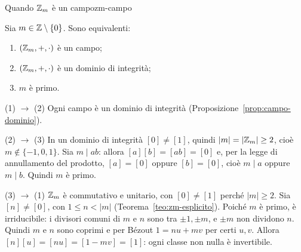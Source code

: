 \begin{concetto}
\begin{Teorema}{Quando $\mathbb{Z}_m$ è un campo}{zm-campo}
    \begin{prerequisiti}
    \end{prerequisiti}
    Sia $m \in \mathbb{Z} \setminus \{0\}$. Sono equivalenti:
    \begin{enumerate}
        \item $(\mathbb{Z}_m, +, \cdot)$ è un campo;
        \item $(\mathbb{Z}_m, +, \cdot)$ è un dominio di integrità;
        \item $m$ è primo.
    \end{enumerate}
\end{Teorema}
\begin{dimostrazione}
    \begin{caso}{(1) $\rightarrow$ (2)}
        Ogni campo è un dominio di integrità (Proposizione~\ref{prop:campo-dominio}).
    \end{caso}
    \begin{caso}{(2) $\rightarrow$ (3)}
        In un dominio di integrità $[0] \neq [1]$, quindi $|m| = |\mathbb{Z}_m| \geq 2$, cioè $m \notin \{-1, 0, 1\}$. Sia $m \mid ab$: allora
        $[a][b] = [ab] = [0]$ e, per la legge di annullamento del prodotto, $[a] = [0]$ oppure $[b] = [0]$, cioè $m \mid a$ oppure $m \mid b$. Quindi $m$ è primo.
    \end{caso}
    \begin{caso}{(3) $\rightarrow$ (1)}
        $\mathbb{Z}_m$ è commutativo e unitario, con $[0] \neq [1]$ perché $|m| \geq 2$. Sia $[n] \neq [0]$, con $1 \leq n < |m|$ (Teorema~\ref{teo:zm-esplicito}). Poiché $m$
        è primo, è irriducibile: i divisori comuni di $m$ e $n$ sono tra $\pm 1, \pm m$, e $\pm m$ non dividono $n$. Quindi $m$ e $n$ sono coprimi e per
        Bézout $1 = nu + mv$ per certi $u, v$. Allora $[n][u] = [nu] = [1 - mv] = [1]$: ogni classe non nulla è invertibile.
    \end{caso}
\end{dimostrazione}
\end{concetto}

